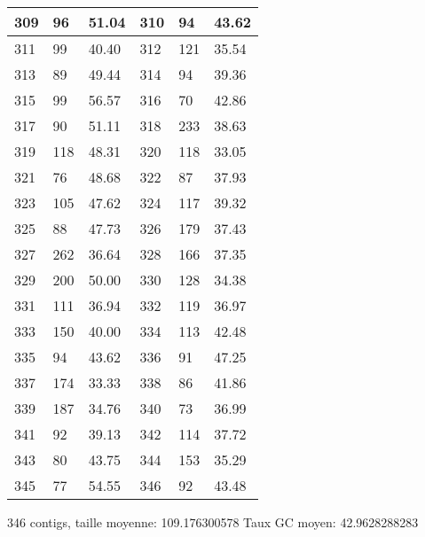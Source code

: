 {\begin{longtable}{|p{3cm}|p{3cm}|p{3cm}|p{3cm}|p{3cm}|p{3cm}|}
\hline
309 & 96& 51.04 & 310 & 94& 43.62\\
\hline
311 & 99& 40.40 & 312 & 121& 35.54\\
\hline
313 & 89& 49.44 & 314 & 94& 39.36\\
\hline
315 & 99& 56.57 & 316 & 70& 42.86\\
\hline
317 & 90& 51.11 & 318 & 233& 38.63\\
\hline
319 & 118& 48.31 & 320 & 118& 33.05\\
\hline
321 & 76& 48.68 & 322 & 87& 37.93\\
\hline
323 & 105& 47.62 & 324 & 117& 39.32\\
\hline
325 & 88& 47.73 & 326 & 179& 37.43\\
\hline
327 & 262& 36.64 & 328 & 166& 37.35\\
\hline
329 & 200& 50.00 & 330 & 128& 34.38\\
\hline
331 & 111& 36.94 & 332 & 119& 36.97\\
\hline
333 & 150& 40.00 & 334 & 113& 42.48\\
\hline
335 & 94& 43.62 & 336 & 91& 47.25\\
\hline
337 & 174& 33.33 & 338 & 86& 41.86\\
\hline
339 & 187& 34.76 & 340 & 73& 36.99\\
\hline
341 & 92& 39.13 & 342 & 114& 37.72\\
\hline
343 & 80& 43.75 & 344 & 153& 35.29\\
\hline
345 & 77& 54.55 & 346 & 92& 43.48\\
\hline
\end{longtable}
}
346 contigs, taille moyenne: 109.176300578 Taux GC moyen: 42.9628288283